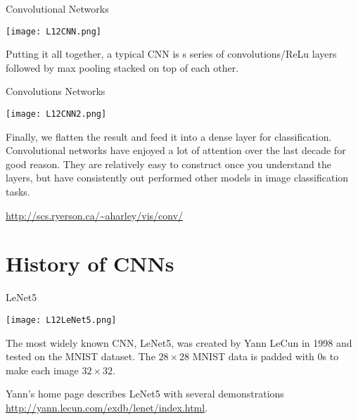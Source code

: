 \documentclass[10pt, table, dvipsnames,xcdraw, handout]{beamer}
\begin{document}
\begin{frame}[fragile]{Convolutional Networks}
  \begin{minipage}[t][0.5\textheight][t]{\textwidth}\centering
	\centering \texttt{[image: L12CNN.png]} 
  \end{minipage}
  \vfill
\begin{minipage}[t][0.5\textheight][t]{\textwidth}
Putting it all together, a typical CNN is s series of convolutions/ReLu layers followed by max pooling stacked on top of each other. 
\end{minipage}
\end{frame}



\begin{frame}[fragile]{Convolutions Networks}
  \begin{minipage}[t][0.4\textheight][t]{\textwidth}\centering
	\centering \texttt{[image: L12CNN2.png]} 
  \end{minipage}
  \vfill
\begin{minipage}[t][0.6\textheight][t]{\textwidth}
Finally, we flatten the result and feed it into a dense layer for classification. \pause Convolutional networks have enjoyed a lot of attention over the last decade for good reason. They are relatively easy to construct once you understand the layers, but have consistently out performed other models in image classification tasks.\pause\newline

\url{http://scs.ryerson.ca/~aharley/vis/conv/}

\end{minipage}
\end{frame}

\section{History of CNNs}

\begin{frame}[fragile]{LeNet5}
  \begin{minipage}[t][0.4\textheight][t]{\textwidth}\centering
	\centering \texttt{[image: L12LeNet5.png]} 
  \end{minipage}
  \vfill
\begin{minipage}[t][0.6\textheight][t]{\textwidth}
The most widely known CNN, LeNet5, was created by Yann LeCun in 1998 and tested on the MNIST dataset. \pause The $28\times 28$ MNIST data is padded with 0s to make each image $32\times 32$. \newline

Yann's home page describes LeNet5 with several demonstrations \url{http://yann.lecun.com/exdb/lenet/index.html}.
\end{minipage}
\end{frame}
\end{document}
